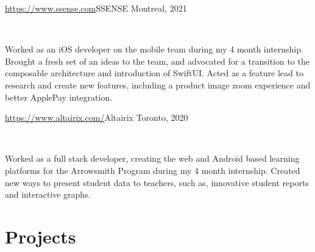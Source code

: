 \documentclass[]{style}
\begin{document}
\begin{entrylist}


\vspace{2mm}

\entry
{\url{https://www.ssense.com}{SSENSE}\vspace{1mm}}
{Montreal, 2021}
{ ~ \vspace{-2.5mm}

    

Worked as an iOS developer on the mobile team during my 4 month internship. Brought a fresh set of an ideas to the team, and advocated for 
a transition to the composable architecture and introduction of SwiftUI. Acted as a feature lead to research and create new features, including a product image zoom experience and better ApplePay integration.}

%
%
%


\entry
{\url{https://www.altairix.com/}{Altairix} \vspace{1mm}}
{Toronto, 2020}
{ ~ \vspace{-2.5mm}

  

Worked as a full stack developer, creating the web and Android based learning platforms for the Arrowsmith Program during my 4 month internship. Created new ways to present student data to teachers, such as, innovative student reports and interactive graphs.}

\end{entrylist}



\section{Projects}
\end{document}
